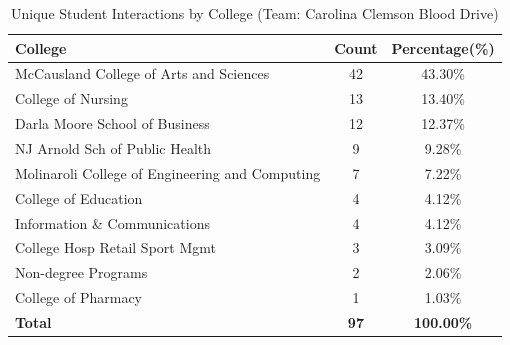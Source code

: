\documentclass[
  letterpaper,
  DIV=11,
  numbers=noendperiod]{scrartcl}
\begin{document}
\begin{table}[!h]
\centering
\caption{\label{tab:RaceGenCCBD}Unique Student Interactions by Race and Gender (Team: Carolina Clemson Blood Drive)}
\centering
{}
\end{table}

\begingroup\fontsize{10}{12}\selectfont

\begin{longtable}[t]{lcc}
\caption{\label{tab:CollegeTabCCBD}Unique Student Interactions by College (Team: Carolina Clemson Blood Drive)}\\
\toprule
\textbf{College} & \textbf{Count} & \textbf{Percentage(\%)}\\
\midrule
McCausland College of Arts and Sciences & 42 & 43.30\%\\
College of Nursing & 13 & 13.40\%\\
Darla Moore School of Business & 12 & 12.37\%\\
NJ Arnold Sch of Public Health & 9 & 9.28\%\\
Molinaroli College of Engineering and Computing & 7 & 7.22\%\\
\addlinespace
College of Education & 4 & 4.12\%\\
Information \& Communications & 4 & 4.12\%\\
College Hosp Retail Sport Mgmt & 3 & 3.09\%\\
Non-degree Programs & 2 & 2.06\%\\
College of Pharmacy & 1 & 1.03\%\\
\midrule
\addlinespace
\textbf{Total} & \textbf{97} & \textbf{100.00\%}\\
\bottomrule
\end{longtable}
\endgroup{}
\end{document}
